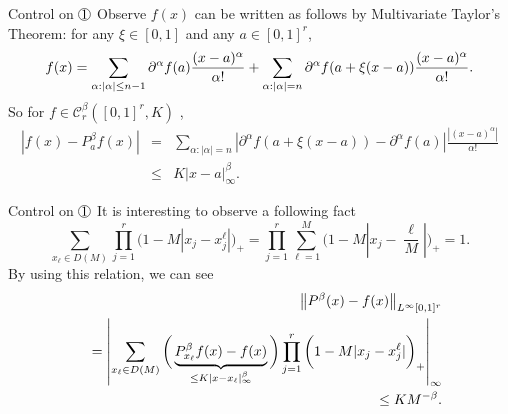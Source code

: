 \documentclass{if-beamer}
\newcommand*\circled[1]{\tikz[baseline=(char.base)]{
            \node[shape=circle,draw,inner sep=0.2pt] (char) {#1};}}
\begin{document}
\begin{frame}{Control on $\circled{1}$}
    Observe $f(x)$ can be written as follows by Multivariate Taylor's Theorem: for any $\xi \in [0,1]$ and any $a \in [0,1]^{r}$,
    \begin{equation*}
        \tiny
        f(x)=\sum_{\alpha:|\alpha|\leq n-1}\partial^{\alpha}f(a)\frac{(x-a)^{\alpha}}{\alpha!}+
        \sum_{\alpha:|\alpha|=n}\partial^{\alpha}f(a+\xi(x-a))\frac{(x-a)^{\alpha}}{\alpha!}.
     \end{equation*}
    So for $f\in\mathcal{C}^{\beta}_{r}([0,1]^{r},K)$ ,
    \begin{eqnarray*}
        |f(x)-P^{\beta}_{a}f(x)| &=& \sum_{\alpha:|\alpha|=n}\left|\partial^{\alpha}f(a+\xi(x-a))-\partial^{\alpha}f(a)\right|\frac{\left|(x-a)^{\alpha}\right|}{\alpha!} \\
        &\leq& K|x-a|_{\infty}^{\beta}.
    \end{eqnarray*}
\end{frame}

\begin{frame}{Control on $\circled{1}$}
    It is interesting to observe a following fact
    \begin{equation*}
        \sum_{x_{\ell}\in D(M)}\prod_{j=1}^{r}\bigg( 1- M|x_{j}-x_{j}^{\ell}| \bigg)_{+}
        =\prod_{j=1}^{r}\sum_{\ell=1}^{M}\bigg( 1- M\left|x_{j}-\frac{\ell}{M}\right| \bigg)_{+}=1.
    \end{equation*}
    By using this relation, we can see
    \begin{eqnarray*}
        \tiny
        &&\left\| P^{\beta}(x) - f(x) \right\|_{L^\infty[0,1]^{r}} \\ 
        &&=\left| \sum_{x_{\ell}\in D(M)}\bigg(\underbrace{P_{x_{\ell}}^{\beta}f(x)-f(x)}_{\leq K|x-x_{\ell}|_{\infty}^{\beta}}\bigg)\prod_{j=1}^{r}\bigg( 1- M|x_{j}-x_{j}^{\ell}| \bigg)_{+} \right|_{\infty} \\
        &&\leq KM^{-\beta}.
    \end{eqnarray*}
\end{frame}
\end{document}
